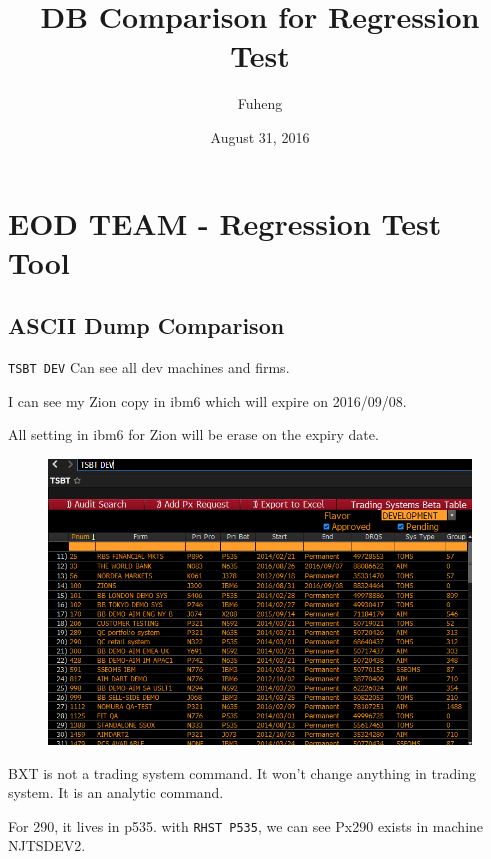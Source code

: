 \documentclass[8pt,]{article}
\title{DB Comparison for Regression Test}
\author{Fuheng}
\date{August 31, 2016}
\begin{document}
\maketitle

{
\hypersetup{linkcolor=black}
\setcounter{tocdepth}{4}
\tableofcontents
}
\pagebreak

\section{EOD TEAM - Regression Test
Tool}\label{eod-team---regression-test-tool}

\subsection{ASCII Dump Comparison}\label{ascii-dump-comparison}

\texttt{TSBT\ DEV} Can see all dev machines and firms.

I can see my Zion copy in ibm6 which will expire on 2016/09/08.

All setting in ibm6 for Zion will be erase on the expiry date.

\begin{figure}[htbp]
\centering
\includegraphics{tsbt_dev.png}
\caption{}
\end{figure}

BXT is not a trading system command. It won't change anything in trading
system. It is an analytic command.

For 290, it lives in p535. with \texttt{RHST\ P535}, we can see Px290
exists in machine NJTSDEV2.
\end{document}
